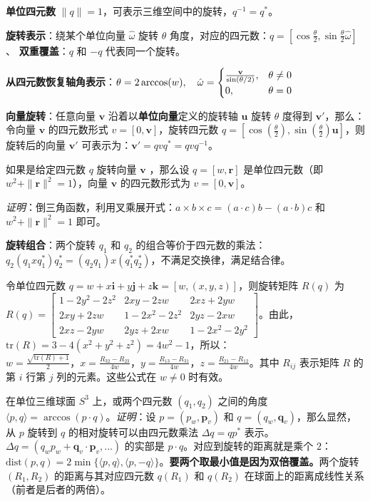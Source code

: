 \documentclass[
  8pt]{extarticle}
\begin{document}
\begin{multicols*}{4}
\textbf{单位四元数}
\(\|q\| = 1\)，可表示三维空间中的旋转，\(q^{-1} = q^*\)。

\textbf{旋转表示}：绕某个单位向量 \(\hat{\omega}\) 旋转 \(\theta\)
角度，对应的四元数：\(q = \left[\cos\frac{\theta}{2}, \sin\frac{\theta}{2} \hat{\omega}\right]\)、
\textbf{双重覆盖}：\(q\) 和 \(-q\) 代表同一个旋转。

\textbf{从四元数恢复轴角表示}：\(\theta = 2 \arccos(w), \quad \hat{\omega} =\begin{cases}\frac{\bold{v}}{\sin(\theta/2)}, & \theta \neq 0 \\0, & \theta = 0\end{cases}\)

\textbf{向量旋转}：任意向量 \(\mathbf{v}\)
沿着以\textbf{单位向量}定义的旋转轴 \(\mathbf{u}\) 旋转 \(\theta\)
度得到 \(\mathbf{v}'\)，那么：令向量 \(\mathbf{v}\) 的四元数形式
\(v = [0, \mathbf{v}]\)，旋转四元数
\(q = \left[\cos\left(\frac{\theta}{2}\right), \sin\left(\frac{\theta}{2}\right)\mathbf{u}\right]\)，则旋转后的向量
\(\mathbf{v}'\) 可表示为：\(\mathbf{v}' = qv q^* = qv q^{-1}\)。

如果是给定四元数 \(q\) 旋转向量 \(\mathbf{v}\) ，那么设
\(q = [w, \mathbf{r}]\) 是单位四元数（即
\(w^2 + \|\mathbf{r}\|^2 = 1\)），向量 \(\mathbf{v}\) 的四元数形式为
\(v = [0, \mathbf{v}]\)。

\emph{证明}：倒三角函数，利用叉乘展开式：\(a \times b \times c = (a \cdot c)b - (a \cdot b)c\)
和 \(w^2 + \|\mathbf{r}\|^2 = 1\) 即可。

\textbf{旋转组合}：两个旋转 \(q_1\) 和 \(q_2\)
的组合等价于四元数的乘法：\(q_2 (q_1 x q_1^*) q_2^* = (q_2 q_1) x (q_1^* q_2^*)\)，不满足交换律，满足结合律。

令单位四元数
\(q = w + x\mathbf{i} + y\mathbf{j} + z\mathbf{k} = [w, (x, y, z)]\)，则旋转矩阵
\(R(q)\) 为
\(R(q) = \begin{bmatrix} 1 - 2y^2 - 2z^2 & 2xy - 2zw & 2xz + 2yw \\ 2xy + 2zw & 1 - 2x^2 - 2z^2 & 2yz - 2xw \\ 2xz - 2yw & 2yz + 2xw & 1 - 2x^2 - 2y^2 \end{bmatrix}\)。由此，\(\text{tr}(R) = 3 - 4(x^2 + y^2 + z^2) = 4w^2 - 1\)，所以：\(w = \frac{\sqrt{\text{tr}(R)+1}}{2}，x = \frac{R_{32}-R_{23}}{4w}，y = \frac{R_{13}-R_{31}}{4w}，z = \frac{R_{21}-R_{12}}{4w}\)。其中
\(R_{ij}\) 表示矩阵 \(R\) 的第 \(i\) 行第 \(j\) 列的元素。这些公式在
\(w \neq 0\) 时有效。

在单位三维球面 \(S^3\) 上，或两个四元数 \((q_1, q_2)\) 之间的角度
\(\langle p, q \rangle = \arccos(p \cdot q)\)。\emph{证明}：设
\(p = (p_w, \mathbf{p}_v)\) 和 \(q = (q_w, \mathbf{q}_v)\)，那么显然，从
\(p\) 旋转到 \(q\) 的相对旋转可以由四元数乘法 \(\Delta q = q p^*\)
表示。\(\Delta q = (q_w p_w + \mathbf{q}_v \cdot \mathbf{p}_v, \dots)\)
的实部是 \(p \cdot q\)。对应到旋转的距离就是乘个
\(2\)：\(\text{dist}(p, q) = 2 \min \{\langle p, q \rangle, \langle p, -q \rangle\}\)。\textbf{要两个取最小值是因为双倍覆盖。}两个旋转
\((R_1, R_2)\) 的距离与其对应四元数 \(q(R_1)\) 和 \(q(R_2)\)
在球面上的距离成线性关系（前者是后者的两倍）。


\end{multicols*}
\end{document}
